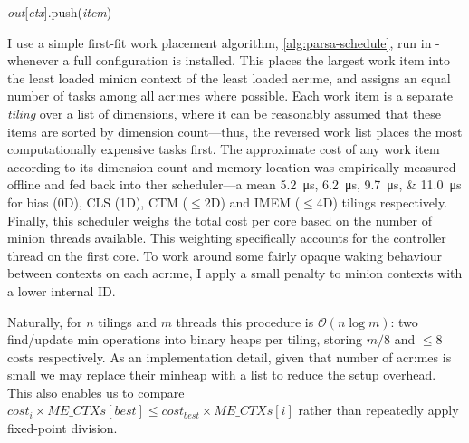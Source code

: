 \begin{algorithm}
{{			\emph{out}[\emph{ctx}].push(\emph{item})\;
		}
	}
\end{algorithm}

I use a simple first-fit work placement algorithm, \cref{alg:parsa-schedule}, run in \approachshort{}-\Coopfw{} whenever a full configuration is installed.
This places the largest work item into the least loaded minion context of the least loaded \gls{acr:me}, and assigns an equal number of tasks among all \glspl{acr:me} where possible.
Each work item is a separate \emph{tiling} over a list of dimensions, where it can be reasonably assumed that these items are sorted by dimension count---thus, the reversed work list places the most computationally expensive tasks first.
The approximate cost of any work item according to its dimension count and memory location was empirically measured offline and fed back into ther scheduler---a mean \qtylist{5.2;6.2;9.7;11.0}{\micro\second} for bias (0D), CLS (1D), CTM ($\le$2D) and IMEM ($\le$4D) tilings respectively.
Finally, this scheduler weighs the total cost per core based on the number of minion threads available.
This weighting specifically accounts for the controller thread on the first core.
To work around some fairly opaque waking behaviour between contexts on each \gls{acr:me}, I apply a small penalty to minion contexts with a lower internal ID.

Naturally, for $n$ tilings and $m$ threads this procedure is $\mathcal{O}{\left(n\log{m}\right)}$: two find/update min operations into binary heaps per tiling, storing $m/8$ and $\le8$ costs respectively.
As an implementation detail, given that number of \glspl{acr:me} is small we may replace their minheap with a list to reduce the setup overhead.
This also enables us to compare $\textit{cost}_i \times \textit{ME\_CTXs}\left[\textit{best}\right] \le \textit{cost}_\textit{best} \times \textit{ME\_CTXs}\left[i\right]$ rather than repeatedly apply fixed-point division.


